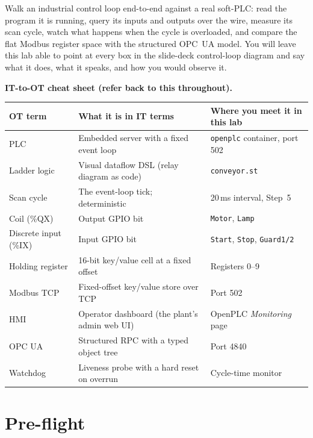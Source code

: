 \documentclass[11pt,a4paper]{article}
\begin{document}
\labheader

\begin{goalbox}
Walk an industrial control loop end-to-end against a real soft-PLC: read the program it is running, query its inputs and outputs over the wire, measure its scan cycle, watch what happens when the cycle is overloaded, and compare the flat Modbus register space with the structured OPC~UA model. You will leave this lab able to point at every box in the slide-deck control-loop diagram and say what it does, what it speaks, and how you would observe it.
\end{goalbox}

\bigskip

\noindent\textbf{IT-to-OT cheat sheet (refer back to this throughout).}
\begin{center}
\footnotesize
\begin{tabular}{@{}lll@{}}
\toprule
\textbf{OT term} & \textbf{What it is in IT terms} & \textbf{Where you meet it in this lab} \\
\midrule
PLC                  & Embedded server with a fixed event loop & \texttt{openplc} container, port 502 \\
Ladder logic         & Visual dataflow DSL (relay diagram as code) & \texttt{conveyor.st} \\
Scan cycle           & The event-loop tick; deterministic & 20\,ms interval, Step~5 \\
Coil (\%QX)          & Output GPIO bit & \texttt{Motor}, \texttt{Lamp} \\
Discrete input (\%IX) & Input GPIO bit & \texttt{Start}, \texttt{Stop}, \texttt{Guard1/2} \\
Holding register     & 16-bit key/value cell at a fixed offset & Registers 0--9 \\
Modbus TCP           & Fixed-offset key/value store over TCP & Port 502 \\
HMI                  & Operator dashboard (the plant's admin web UI) & OpenPLC \emph{Monitoring} page \\
OPC UA               & Structured RPC with a typed object tree & Port 4840 \\
Watchdog             & Liveness probe with a hard reset on overrun & Cycle-time monitor \\
\bottomrule
\end{tabular}
\end{center}

\section*{Pre-flight}
\end{document}
